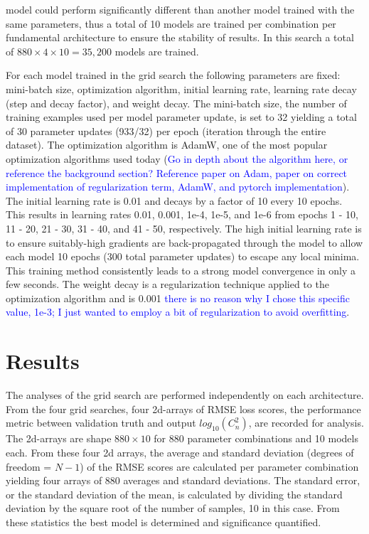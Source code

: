 model could perform significantly different than another model trained with the same parameters, thus a total of 10 models are trained per combination per fundamental architecture to ensure the stability of results. In this search a total of $880 \times 4 \times 10 = 35,200$ models are trained.

For each model trained in the grid search the following parameters are fixed: mini-batch size, optimization algorithm, initial learning rate, learning rate decay (step and decay factor), and weight decay. The mini-batch size, the number of training examples used per model parameter update, is set to 32 yielding a total of 30 parameter updates (933/32) per epoch (iteration through the entire dataset). The optimization algorithm is AdamW, one of the most popular optimization algorithms used today (\textcolor{blue}{Go in depth about the algorithm here, or reference the background section? Reference paper on Adam, paper on correct implementation of regularization term, AdamW, and pytorch implementation}). The initial learning rate is 0.01 and decays by a factor of 10 every 10 epochs. This results in learning rates 0.01, 0.001, 1e-4, 1e-5, and 1e-6 from epochs 1 - 10, 11 - 20, 21 - 30, 31 - 40, and 41 - 50, respectively. The high initial learning rate is to ensure suitably-high gradients are back-propagated through the model to allow each model 10 epochs (300 total parameter updates) to escape any local minima. This training method consistently leads to a strong model convergence in only a few seconds. The weight decay is a regularization technique applied to the optimization algorithm and is 0.001 \textcolor{blue}{there is no reason why I chose this specific value, 1e-3; I just wanted to employ a bit of regularization to avoid overfitting}.

\section{Results}
The analyses of the grid search are performed independently on each architecture. From the four grid searches, four 2d-arrays of RMSE loss scores, the performance metric between validation truth and output $log_{10}(C_{n}^{2})$, are recorded for analysis. The 2d-arrays are shape $880 \times 10$ for 880 parameter combinations and 10 models each. From these four 2d arrays, the average and standard deviation (degrees of freedom = $N - 1$) of the RMSE scores are calculated per parameter combination yielding four arrays of 880 averages and standard deviations. The standard error, or the standard deviation of the mean, is calculated by dividing the standard deviation by the square root of the number of samples, 10 in this case. From these statistics the best model is determined and significance quantified.

